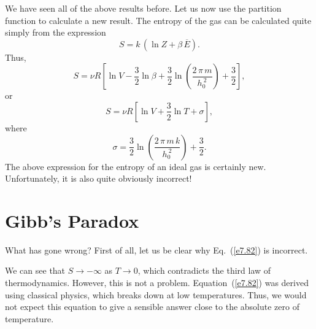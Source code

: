 We have seen all of the above results 
 before. Let us
now use the partition function to calculate a new result. The entropy of the
gas can be calculated quite simply from the expression 
\begin{equation}
S = k\,(\ln Z + \beta\, \overline{E}).
\end{equation}
Thus, 
\begin{equation}
S = \nu R \left[ \ln V -\frac{3}{2} \ln \beta + \frac{3}{2}\ln\!
\left(\frac{2\,\pi\, m }{h_0^{~2}}\right) + \frac{3}{2} \right],
\end{equation}
or
\begin{equation}\label{e7.82}
S  = \nu R \left[ \ln V + \frac{3}{2}\ln T + \sigma\right],
\end{equation}
where
\begin{equation}
\sigma = \frac{3}{2} \ln \!\left( \frac{2\,\pi\, m\,k}{h_0^{~2}}\right) + 
\frac{3}{2}.
\end{equation}
The above expression for the entropy of an ideal gas is certainly new. 
Unfortunately, it is also quite obviously incorrect!

\section{Gibb's Paradox}\label{s7.9}
What has gone wrong? First of all, let us be clear why Eq.~(\ref{e7.82}) is 
incorrect.

We can see that $S\rightarrow -\infty$ as $T\rightarrow 0$, which contradicts
the
third law of thermodynamics. However,
this is not a problem. Equation~(\ref{e7.82}) was derived
using classical physics, which breaks down at low temperatures. Thus, we would
not expect this equation  to give a sensible answer close to the absolute zero of temperature.

